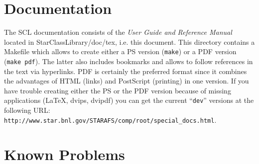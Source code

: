 \documentclass[twoside]{article}
\newcommand{\name}[1]{\textsf{#1}}%
\begin{document}
\section{Documentation}   

The SCL documentation consists of the {\em User Guide and Reference
    Manual} located in \name{StarClassLibrary/doc/tex}, i.e.  this
document. This directory contains a Makefile which allows to create
either a PS version (\texttt{make}) or a PDF version (\texttt{make
    pdf}). The latter also includes bookmarks and allows to follow
references in the text via hyperlinks. PDF is certainly the preferred
format since it combines the advantages of HTML (links) and PostScript
(printing) in one version. If you have trouble creating either the PS
or the PDF version because of missing applications (LaTeX, dvips,
dvipdf) you can get the current ``\texttt{dev}'' versions at the
following URL:
\texttt{http://www.star.bnl.gov/STARAFS/comp/root/special\_docs.html}.
                         
\section{Known Problems} 
\end{document}
